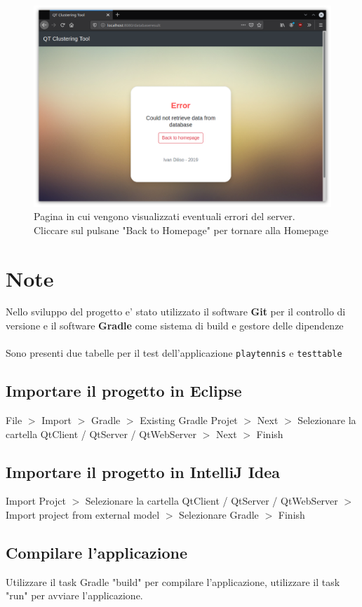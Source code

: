 \documentclass{article}
\begin{document}
    \begin{figure}[H]
        \includegraphics[scale=0.4]{ADDON8}
        \caption{Pagina in cui vengono visualizzati eventuali errori del 
        server. Cliccare sul pulsane "Back to Homepage" per tornare alla 
        Homepage}   
        \label{fig:12}
    \end{figure} 


    \section{Note}
    Nello sviluppo del progetto e' stato utilizzato il software 
    \textbf{Git} per il controllo di versione e il software 
    \textbf{Gradle} come sistema di build e gestore delle dipendenze \\\\
    Sono presenti due tabelle per il test dell'applicazione \verb|playtennis| 
    e \verb|testtable|
        \subsection{Importare il progetto in Eclipse}
        File $>$ Import $>$ Gradle $>$ Existing Gradle Projet $>$ Next $>$
        Selezionare la cartella QtClient / QtServer / QtWebServer $>$ Next $>$
        Finish
        \subsection{Importare il progetto in IntelliJ  Idea}
        Import Projct $>$
         Selezionare la cartella QtClient / QtServer / QtWebServer 
         $>$
        Import project from external model $>$ Selezionare Gradle $>$ Finish 

        \subsection{Compilare l'applicazione}
        Utilizzare il task Gradle "build" per compilare l'applicazione, 
        utilizzare il task "run" per avviare l'applicazione.
\end{document}
